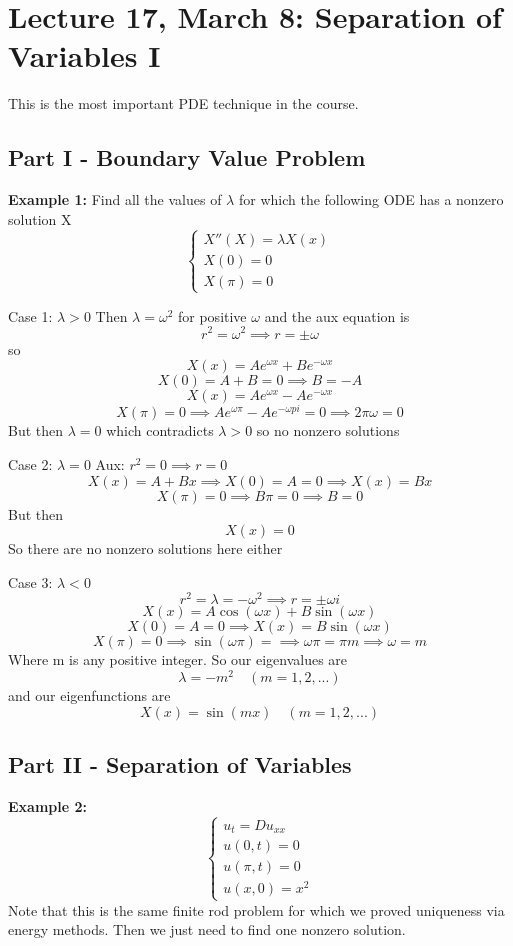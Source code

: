 \documentclass[12pt]{article}
\begin{document}
\section{Lecture 17, March 8: Separation of Variables I}
This is the most important PDE technique in the course. 

\subsection*{Part I - Boundary Value Problem}
\textbf{Example 1:}
Find all the values of $\lambda$ for which the following ODE has a nonzero solution X 
\[\begin{cases}
    X''(X) = \lambda X(x)\\
    X(0) = 0\\
    X(\pi) = 0
\end{cases}\]

Case 1: $\lambda > 0$ 
Then $\lambda = \omega^2$ for positive $\omega$ and the aux equation is 
\[r^2 = \omega^2 \implies r = \pm \omega\]
so 
\[X(x) = Ae^{\omega x} + Be^{-\omega x}\] 
\[X(0) = A + B = 0 \implies B = -A\]
\[X(x) = Ae^{\omega x} -Ae^{-\omega x}\]
\[X(\pi) = 0 \implies Ae^{\omega \pi} -Ae^{-\omega pi} = 0 \implies 2\pi \omega = 0\]
But then $\lambda = 0$ which contradicts $\lambda >0$ so no nonzero solutions 

Case 2: $\lambda = 0$
Aux: $r^2 = 0 \implies r = 0$
\[X(x) = A + Bx \implies X(0) = A = 0 \implies X(x) = Bx\]
\[X(\pi) = 0 \implies B\pi = 0 \implies B = 0\]
But then 
\[X(x) = 0\]
So there are no nonzero solutions here either 

Case 3: $\lambda < 0$
\[r^2 = \lambda = -\omega^2 \implies r = \pm \omega i\]
\[X(x) = A\cos(\omega x) + B\sin(\omega x)\]
\[X(0) = A = 0 \implies X(x) = B\sin(\omega x)\]
\[X(\pi) = 0 \implies \sin(\omega \pi) = \implies \omega \pi = \pi m \implies \omega = m\]
Where m is any positive integer. So our eigenvalues are
\[\lambda = -m^2 \quad (m = 1, 2, ...)\]
and our eigenfunctions are 
\[X(x) = \sin(mx) \quad (m = 1, 2, ...)\]

\subsection*{Part II - Separation of Variables}
\textbf{Example 2:}
\[\begin{cases}
    u_t = Du_{xx}\\
    u(0, t) = 0\\
    u(\pi, t) = 0\\
    u(x, 0) = x^2
\end{cases}\]
Note that this is the same finite rod problem for which we proved uniqueness via energy methods. Then we just need to find one nonzero solution.
\end{document}
